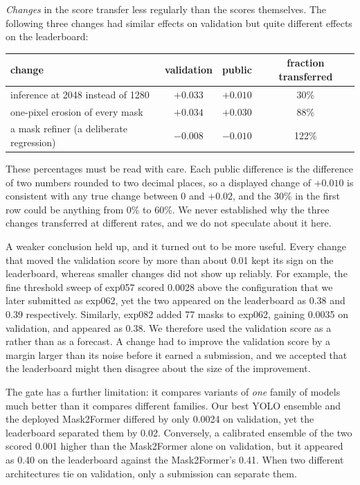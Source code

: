 \emph{Changes} in the score transfer less regularly than the scores themselves. The following
three changes had similar effects on validation but quite different effects on the leaderboard:
\begin{center}\small
\begin{tabular}{@{}lccc@{}}
\toprule
change & validation & public & fraction transferred \\
\midrule
inference at 2048 instead of 1280 & $+0.033$ & $+0.010$ & 30\% \\
one-pixel erosion of every mask & $+0.034$ & $+0.030$ & 88\% \\
a mask refiner (a deliberate regression) & $-0.008$ & $-0.010$ & 122\% \\
\bottomrule
\end{tabular}
\end{center}
These percentages must be read with care. Each public difference is the difference of two numbers
rounded to two decimal places, so a displayed change of $+0.010$ is consistent with any true change
between 0 and $+0.02$, and the 30\% in the first row could be anything from 0\% to 60\%. We never
established why the three changes transferred at different rates, and we do not speculate about it
here.

A weaker conclusion held up, and it turned out to be more useful. Every change that moved the
validation score by more than about 0.01 kept its sign on the leaderboard, whereas smaller changes
did not show up reliably. For example, the fine threshold sweep of exp057 scored 0.0028 above the
configuration that we later submitted as exp062, yet the two appeared on the leaderboard as 0.38
and 0.39 respectively. Similarly, exp082 added 77 masks to exp062, gaining 0.0035 on validation,
and appeared as 0.38. We therefore used the validation score as a  rather than as a
forecast. A change had to improve the validation score by a margin larger than its noise before it
earned a submission, and we accepted that the leaderboard might then disagree about the size of the
improvement.

The gate has a further limitation: it compares variants of \emph{one} family of models much better
than it compares different families. Our best YOLO ensemble and the deployed Mask2Former differed
by only 0.0024 on validation, yet the leaderboard separated them by 0.02. Conversely, a calibrated
ensemble of the two scored 0.001 higher than the Mask2Former alone on validation, but it appeared as
0.40 on the leaderboard against the Mask2Former's 0.41. When two different architectures tie on
validation, only a submission can separate them.

